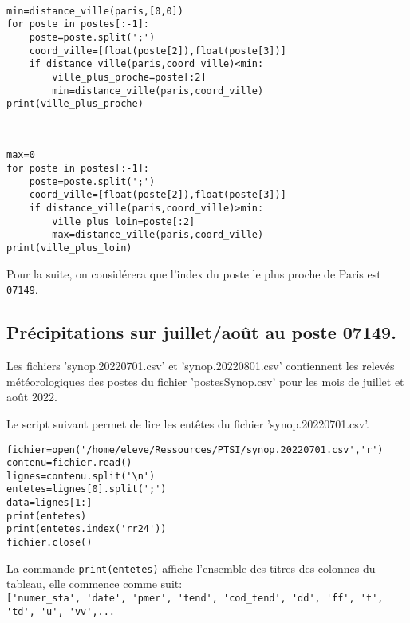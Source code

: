 \begin{solution}~\ \\
\begin{verbatim}
min=distance_ville(paris,[0,0])
for poste in postes[:-1]:
    poste=poste.split(';')
    coord_ville=[float(poste[2]),float(poste[3])]
    if distance_ville(paris,coord_ville)<min:
        ville_plus_proche=poste[:2]
        min=distance_ville(paris,coord_ville)
print(ville_plus_proche)
\end{verbatim}
\end{solution}



\begin{solution}~\ \\
\begin{verbatim}
max=0
for poste in postes[:-1]:
    poste=poste.split(';')
    coord_ville=[float(poste[2]),float(poste[3])]
    if distance_ville(paris,coord_ville)>min:
        ville_plus_loin=poste[:2]
        max=distance_ville(paris,coord_ville)
print(ville_plus_loin)
\end{verbatim}
\end{solution}

Pour la suite, on considérera que l'index du poste le plus proche de Paris est \verb?07149?.

\subsection{Précipitations sur juillet/août au poste 07149.}

Les fichiers 'synop.20220701.csv' et 'synop.20220801.csv' contiennent les relevés météorologiques des postes du fichier 'postesSynop.csv' pour les mois de juillet et août 2022.

Le script suivant permet de lire les entêtes du fichier 'synop.20220701.csv'.

\begin{verbatim}
fichier=open('/home/eleve/Ressources/PTSI/synop.20220701.csv','r')
contenu=fichier.read()
lignes=contenu.split('\n')
entetes=lignes[0].split(';')
data=lignes[1:]
print(entetes)
print(entetes.index('rr24'))
fichier.close()
\end{verbatim}

La commande \verb?print(entetes)? affiche l'ensemble des titres des colonnes du tableau, elle commence comme suit: \\
\verb?['numer_sta', 'date', 'pmer', 'tend', 'cod_tend', 'dd', 'ff', 't', 'td', 'u', 'vv',...?


